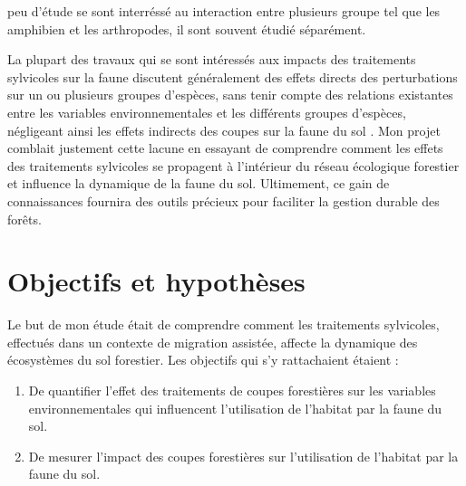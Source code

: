 peu d'étude se sont interréssé au interaction entre plusieurs groupe tel que les amphibien et les arthropodes, il sont souvent étudié séparément.

La plupart des travaux qui se sont intéressés aux impacts des traitements sylvicoles sur la faune discutent généralement des effets directs des perturbations sur un ou plusieurs groupes d'espèces, 
sans tenir compte des relations existantes entre les variables environnementales et les différents groupes d'espèces, 
négligeant ainsi les effets indirects des coupes sur la faune du sol \citep{josephIntegratingOccupancyModels2016,Pollierer2021Diversityfunctional,Kudrin2023metaanalysiseffects}. 
Mon projet comblait justement cette lacune en essayant de comprendre comment les effets des traitements sylvicoles se propagent à l’intérieur du réseau écologique forestier et influence la dynamique de la faune du sol.  
Ultimement, ce gain de connaissances fournira des outils précieux pour faciliter la gestion durable des forêts.



\section*{Objectifs et hypothèses}
\label{sec:objectifs}

Le but de mon étude était de comprendre comment les traitements sylvicoles, effectués dans un contexte de migration assistée, 
affecte la dynamique des écosystèmes du sol forestier. Les objectifs qui s’y rattachaient étaient :

\begin{enumerate}
    \item De quantifier l'effet des traitements de coupes forestières sur les variables environnementales qui influencent l'utilisation de l'habitat par la faune du sol.
    \item De mesurer l'impact des coupes forestières sur l'utilisation de l'habitat par la faune du sol.
\end{enumerate}

